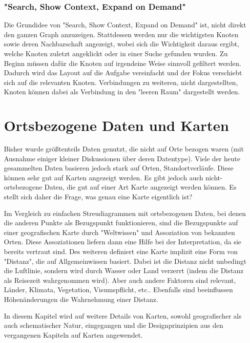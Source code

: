 			\subsubsection{"Search, Show Context, Expand on Demand"}
				Die Grundidee von "Search, Show Context, Expand on Demand" ist, nicht direkt den ganzen Graph anzuzeigen. Stattdessen werden nur die wichtigsten Knoten sowie deren Nachbarschaft angezeigt, wobei sich die Wichtigkeit daraus ergibt, welche Knoten zuletzt angeklickt oder in einer Suche gefunden wurden. Zu Beginn müssen dafür die Knoten auf irgendeine Weise sinnvoll gefiltert werden. Dadurch wird das Layout auf die Aufgabe vereinfacht und der Fokus verschiebt sich auf die relevanten Knoten. Verbindungen zu weiteren, nicht dargestellten, Knoten können dabei als Verbindung in den "leeren Raum" dargestellt werden.

	\section{Ortsbezogene Daten und Karten}
		\label{sec:karten}

		Bisher wurde größtenteils Daten genutzt, die nicht auf Orte bezogen waren (mit Ausnahme einiger kleiner Diskussionen über deren Datentype). Viele der heute gesammelten Daten basieren jedoch stark auf Orten, \bspw Standortverläufe. Diese können sehr gut auf Karten angezeigt werden. Es gibt jedoch auch nicht-ortsbezogene Daten, die gut auf einer Art Karte angezeigt werden können. Es stellt sich daher die Frage, was genau eine Karte eigentlich ist?

		Im Vergleich zu einfachen Streudiagrammen mit ortsbezogenen Daten, bei denen die anderen Punkte als Bezugspunkt funktionieren, sind die Bezugspunkte auf einer geografischen Karte durch "Weltwissen" und Assoziation von bekannten Orten. Diese Assoziationen liefern dann eine Hilfe bei der Interpretation, da sie bereits vertraut sind. Des weiteren definiert eine Karte implizit eine Form von "Distanz", die auf Allgemeinwissen basiert. Dabei ist die Distanz nicht unbedingt die Luftlinie, sondern wird \bspw durch Wasser oder Land verzerrt (indem die Distanz als Reisezeit wahrgenommen wird). Aber auch andere Faktoren sind relevant, \zB Länder, Klimata, Vegetation, Visumspflicht, etc.. Ebenfalls sind beeinflussen Höhenänderungen die Wahrnehmung einer Distanz.

		In diesem Kapitel wird auf weitere Details von Karten, sowohl geografischer als auch schematischer Natur, eingegangen und die Designprinzipien aus den vergangenen Kapiteln auf Karten angewendet.

